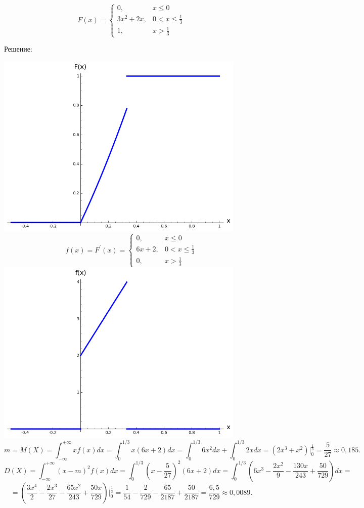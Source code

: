 \documentclass{article}
\renewcommand{\le}{\ensuremath{\leqslant}}
\begin{document}
\begin{enumerate}
\begin{equation*}
F(x) =
 \begin{cases}
  0, & x\le0\\
  3x^2+2x, & 0<x\le\frac{1}{3}\\
  1, & x>\frac{1}{3}
 \end{cases}
\end{equation*}
\begin{center}Решение:\end{center}
\includegraphics[width=340pt,natwidth=784,natheight=581]{4_6_1.png}
\begin{equation*}
f(x) = F^{\prime}(x) =
 \begin{cases}
  0, & x\le0\\
  6x+2, & 0<x\le\frac{1}{3}\\
  0, & x>\frac{1}{3}
 \end{cases}
\end{equation*}
\includegraphics[width=340pt,natwidth=784,natheight=581]{4_6_2.png}
$$m=M(X)=\int_{-\infty}^{+\infty} x f(x) dx=\int_{0}^{1/3} x(6x+2) dx=\int_{0}^{1/3} 6x^2dx + \int_{0}^{1/3} 2xdx=(2x^3+x^2)\bigg|_{0}^{\frac{1}{3}}=\frac{5}{27}\approx0,185.$$
$$D(X)=\int_{-\infty}^{+\infty} (x-m)^2 f(x) dx=\int_{0}^{1/3} \left(x-\frac{5}{27}\right)^2(6x+2) dx=\int_{0}^{1/3} \left(6x^3-\frac{2x^2}{9}-\frac{130x}{243}+\frac{50}{729}\right) dx=$$
$$=\left(\frac{3x^4}{2}-\frac{2x^3}{27}-\frac{65x^2}{243}+\frac{50x}{729}\right)\bigg|_{0}^{\frac{1}{3}}=\frac{1}{54}-\frac{2}{729}-\frac{65}{2187}+\frac{50}{2187}=\frac{6,5}{729}\approx0,0089.$$


\end{enumerate}
\end{document}
